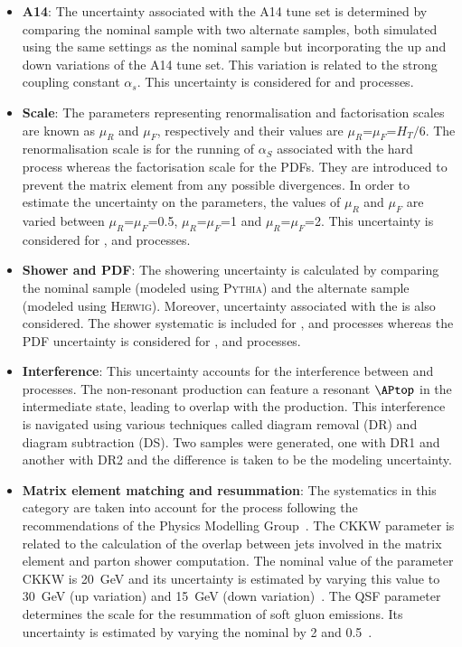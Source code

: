 \begin{itemize}
  
  \item \textbf{A14}: The uncertainty associated with the A14 tune set is determined by comparing the nominal sample with 
  two alternate samples, both simulated using the same settings as the nominal sample but incorporating 
  the up and down variations of the A14 tune set. This variation is related to the strong 
  coupling constant $\alpha_s$. This uncertainty is considered for \tZq and \ttZ processes. 

  \item \textbf{Scale}: The parameters representing renormalisation and factorisation scales are 
  known as $\mu_R$ and $\mu_F$, respectively and their values are $\mu_R$=$\mu_F$=$H_T/6$. The renormalisation
  scale is for the running of $\alpha_S$ associated with the hard process whereas the 
  factorisation scale for the PDFs. They are introduced to prevent the matrix 
  element from any possible divergences. In order to estimate the uncertainty on the parameters, the values
  of $\mu_R$ and $\mu_F$ are varied between $\mu_R$=$\mu_F$=0.5, $\mu_R$=$\mu_F$=1 and $\mu_R$=$\mu_F$=2. This
  uncertainty is considered for \tZq, \diboson and \ttZ processes.

  \item \textbf{Shower and PDF}: The showering uncertainty is calculated by comparing the nominal sample (modeled using \textsc{Pythia})
  and the alternate sample (modeled using \textsc{Herwig}). Moreover, uncertainty associated 
  with the  is also considered. The shower systematic is included for \tZq, \ttZ and \ttbar processes
  whereas the PDF uncertainty is considered for \tZq, \diboson and \ttZ processes. 

  \item \textbf{Interference}: This uncertainty accounts for the interference between \ttZ and \tWZ
  processes. The non-resonant \tWZ production can feature a resonant $\APtop$ in the intermediate state,
  leading to overlap with the \ttZ production. This interference is navigated using various techniques 
  called diagram removal (DR) and diagram subtraction (DS). Two \tWZ samples were generated, one with 
  DR1 and another with DR2 and the difference is taken to be the \tWZ modeling uncertainty. 

  \item \textbf{Matrix element matching and resummation}: The systematics in this category are
  taken into account for the \diboson process following the recommendations
  of the Physics Modelling Group~\cite{twikiPMG,twikiPMGVV}. The CKKW parameter is related to the calculation of 
  the overlap between jets involved in the matrix element and parton shower computation. The nominal 
  value of the parameter CKKW is \qty{20}{GeV} and its uncertainty is estimated by varying this value 
  to \qty{30}{GeV} (up variation) and \qty{15}{GeV} (down variation)~\cite{Anders:2125718}. The QSF parameter determines the 
  scale for the resummation of soft gluon emissions. Its uncertainty is estimated by varying the nominal
  by 2 and 0.5~\cite{Anders:2125718}.


\end{itemize}
